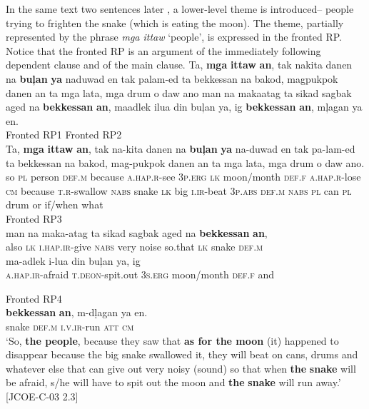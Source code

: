 In the same text two sentences later , a lower-level theme is introduced-- people trying to frighten the snake (which is eating the moon). The theme, partially represented by the phrase \textit{mga ittaw} ‘people’, is expressed in the fronted RP. Notice that the fronted RP is an argument of the immediately following dependent clause and of the main clause.
\ea 
\label{bkm:Ref372884211}
\label{bkm:Ref113975815}
Ta,  \textbf{mga}  \textbf{ittaw}  \textbf{an},  tak  nakita  danen  na  \textbf{buļan}  \textbf{ya} naduwad  en  tak  palam-ed  ta  bekkessan  na  bakod, magpukpok  danen  an  ta  mga  lata,  mga  drum  o  daw  ano man na  makaatag  ta  sikad  sagbak  aged  na  \textbf{bekkessan}  \textbf{an}, maadlek ilua  din  buļan  ya,  ig  \textbf{bekkessan}  \textbf{an},  mļagan  ya  en. \\\smallskip
\hspace{.5cm} Fronted RP1 \hspace{5.2cm}                Fronted RP2 \\
\gll Ta,  \textbf{mga}  \textbf{ittaw}  \textbf{an},  tak  na-kita  danen  na  \textbf{buļan}  \textbf{ya} na-duwad  en  tak  pa-lam-ed  ta  bekkessan  na  bakod, mag-pukpok  danen  an  ta  mga  lata,  mga  drum  o  daw  ano.\footnotemark{} \\
so	\textsc{pl}	person	\textsc{def.m}	because	\textsc{a.hap.r}-see	3\textsc{p.erg}	\textsc{lk}	moon/month	\textsc{def.f} \textsc{a.hap.r}-lose	\textsc{cm}	because	\textsc{t.r}-swallow	\textsc{nabs}	snake	\textsc{lk}	big \textsc{i.ir}-beat	3\textsc{p.abs}	\textsc{def.m}	\textsc{nabs}	\textsc{pl}	can	\textsc{pl}	drum	or	if/when	what \\\smallskip
\hspace{7.8cm} Fronted RP3 \\
\gll   man na  maka-atag  ta  sikad  sagbak  aged  na  \textbf{bekkessan}  \textbf{an}, \\
also \textsc{lk}  \textsc{i.hap.ir}-give  \textsc{nabs}  very  noise  so.that  \textsc{lk}  snake  \textsc{def.m} \\
\gll ma-adlek i-lua  din  buļan  ya,  ig\footnotemark{} \\
\textsc{a.hap.ir}-afraid \textsc{t.deon}-spit.out  3\textsc{s.erg}  moon/month  \textsc{def.f}  and \\\smallskip
 {}

Fronted RP4 \\
\gll \textbf{bekkessan}  \textbf{an},  m-dļagan  ya  en. \\
snake  \textsc{def.m}  \textsc{i.v.ir}-run  \textsc{att}  \textsc{cm} \\
\newpage
\glt `So, \textbf{the people}, because they saw that \textbf{as for the moon} (it) happened to disappear because the big snake swallowed it, they will beat on cans, drums and whatever else that can give out very noisy (sound) so that when \textbf{the} \textbf{snake} will be afraid, s/he will have to spit out the moon and \textbf{the} \textbf{snake} will run away.’ [JCOE-C-03 2.3]
\z


